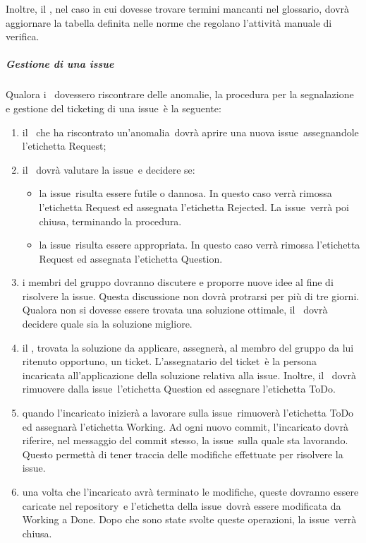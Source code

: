 \documentclass[../NormeProgetto.tex]{subfiles}
\begin{document}
		Inoltre, il \verificatore, nel caso in cui dovesse trovare termini mancanti nel glossario, dovrà aggiornare la tabella definita nelle norme che regolano l'attività manuale di verifica.
			
		\subparagraph{Gestione di una issue}
		Qualora i \verificatori\ dovessero riscontrare delle anomalie, la procedura per la segnalazione e gestione del ticketing di una issue\g\ è la seguente:
		\begin{enumerate}
			\item il \verificatore\ che ha riscontrato un'anomalia\g\ dovrà aprire una nuova issue\g\ assegnandole l'etichetta Request;
			\item il \responsabilediprogetto\ dovrà valutare la issue\g\ e decidere se:			\begin{itemize}
				\item la issue\g\ risulta essere futile o dannosa. In questo caso verrà rimossa l'etichetta Request ed assegnata l'etichetta Rejected. La issue\g\ 
verrà poi chiusa, terminando la procedura.
				\item la issue\g\ risulta essere appropriata. In questo caso verrà rimossa l'etichetta Request ed assegnata l'etichetta Question. 
			\end{itemize}
			\item i membri del gruppo dovranno discutere e proporre nuove idee al fine di risolvere la issue\g. Questa discussione non dovrà protrarsi per più di tre giorni. Qualora non si dovesse essere trovata una soluzione ottimale, il \responsabilediprogetto\ dovrà decidere quale sia la soluzione migliore.
			\item il \responsabilediprogetto, trovata la soluzione da applicare,  assegnerà, al membro del gruppo da lui ritenuto opportuno, un ticket\g. L'assegnatario del ticket\g\ è la persona incaricata all'applicazione della soluzione relativa alla issue\g. Inoltre, il \responsabilediprogetto\ dovrà rimuovere dalla issue\g\ l'etichetta Question ed assegnare l'etichetta ToDo.
			\item quando l'incaricato inizierà a lavorare sulla issue\g\ rimuoverà l'etichetta ToDo ed assegnarà l'etichetta Working. Ad ogni nuovo commit, l'incaricato dovrà riferire, nel messaggio del commit stesso, la issue\g\ 
sulla quale sta lavorando. Questo permettà di tener traccia delle modifiche effettuate per risolvere la issue\g.
			\item una volta che l'incaricato avrà terminato le modifiche, queste dovranno essere caricate nel repository\g\ e l'etichetta della issue\g\ dovrà essere modificata da Working a Done. Dopo che sono state svolte queste operazioni, la issue\g\ 
verrà chiusa.
		\end{enumerate}
		
\end{document}

